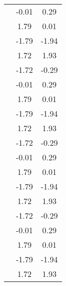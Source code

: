 \begin{table}
\begin{tabular}{c|cc|}
\multicolumn{1}{|c|}{} & \multicolumn{1}{|c|}{     -0.01} & \multicolumn{1}{|c|}{      0.29} \\ 
\multicolumn{1}{|c|}{} & \multicolumn{1}{|c|}{      1.79} & \multicolumn{1}{|c|}{      0.01} \\ 
\multicolumn{1}{|c|}{} & \multicolumn{1}{|c|}{     -1.79} & \multicolumn{1}{|c|}{     -1.94} \\ 
\multicolumn{1}{|c|}{} & \multicolumn{1}{|c|}{      1.72} & \multicolumn{1}{|c|}{      1.93} \\ 
\multicolumn{1}{|c|}{} & \multicolumn{1}{|c|}{     -1.72} & \multicolumn{1}{|c|}{     -0.29} \\ 
\multicolumn{1}{|c|}{} & \multicolumn{1}{|c|}{     -0.01} & \multicolumn{1}{|c|}{      0.29} \\ 
\multicolumn{1}{|c|}{} & \multicolumn{1}{|c|}{      1.79} & \multicolumn{1}{|c|}{      0.01} \\ 
\multicolumn{1}{|c|}{} & \multicolumn{1}{|c|}{     -1.79} & \multicolumn{1}{|c|}{     -1.94} \\ 
\multicolumn{1}{|c|}{} & \multicolumn{1}{|c|}{      1.72} & \multicolumn{1}{|c|}{      1.93} \\ 
\multicolumn{1}{|c|}{} & \multicolumn{1}{|c|}{     -1.72} & \multicolumn{1}{|c|}{     -0.29} \\ 
\multicolumn{1}{|c|}{} & \multicolumn{1}{|c|}{     -0.01} & \multicolumn{1}{|c|}{      0.29} \\ 
\multicolumn{1}{|c|}{} & \multicolumn{1}{|c|}{      1.79} & \multicolumn{1}{|c|}{      0.01} \\ 
\multicolumn{1}{|c|}{} & \multicolumn{1}{|c|}{     -1.79} & \multicolumn{1}{|c|}{     -1.94} \\ 
\multicolumn{1}{|c|}{} & \multicolumn{1}{|c|}{      1.72} & \multicolumn{1}{|c|}{      1.93} \\ 
\multicolumn{1}{|c|}{} & \multicolumn{1}{|c|}{     -1.72} & \multicolumn{1}{|c|}{     -0.29} \\ 
\multicolumn{1}{|c|}{} & \multicolumn{1}{|c|}{     -0.01} & \multicolumn{1}{|c|}{      0.29} \\ 
\multicolumn{1}{|c|}{} & \multicolumn{1}{|c|}{      1.79} & \multicolumn{1}{|c|}{      0.01} \\ 
\multicolumn{1}{|c|}{} & \multicolumn{1}{|c|}{     -1.79} & \multicolumn{1}{|c|}{     -1.94} \\ 
\multicolumn{1}{|c|}{} & \multicolumn{1}{|c|}{      1.72} & \multicolumn{1}{|c|}{      1.93} \\ 

\end{tabular}
\end{table}
